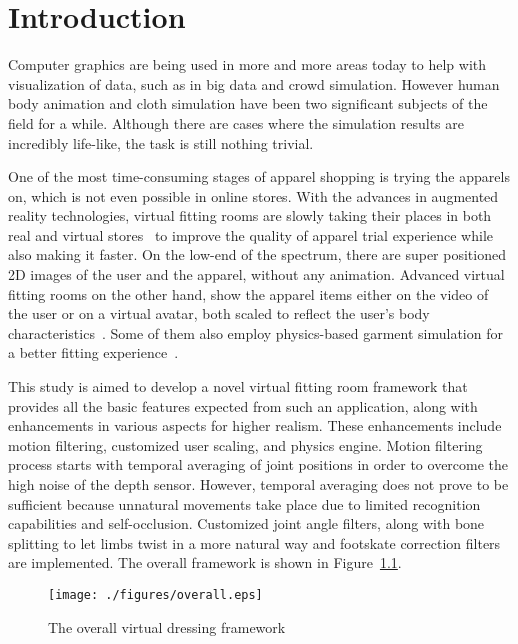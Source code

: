 \chapter{Introduction}
\label{chapter_introduction}

Computer graphics are being used in more and more areas today to help with visualization of data, such as in big data and crowd simulation. However human body animation and cloth simulation have been two significant subjects of the field for a while. Although there are cases where the simulation results are incredibly life-like, the task is still nothing trivial. 

One of the most time-consuming stages of apparel shopping is trying the apparels on, which is not even possible in online stores. With the advances in augmented reality technologies, virtual fitting rooms are slowly taking their places in both real and virtual stores~\cite{Fitnect2012,Styku2013} to improve the quality of apparel trial experience while also making it faster. On the low-end of the spectrum, there are super positioned 2D images of the user and the apparel, without any animation. Advanced virtual fitting rooms on the other hand, show the apparel items either on the video of the user or on a virtual avatar, both scaled to reflect the user's body characteristics~\cite{FaceCake2013}. Some of them also employ physics-based garment simulation for a better fitting experience~\cite{Styku2013}.

This study is aimed to develop a novel virtual fitting room framework that provides all the basic features expected from such an application, along with enhancements in various aspects for higher realism. These enhancements include motion filtering, customized user scaling, and physics engine. Motion filtering process starts with temporal averaging of joint positions in order to overcome the high noise of the depth sensor. However, temporal averaging does not prove to be sufficient because unnatural movements take place due to limited recognition capabilities and self-occlusion. Customized joint angle filters, along with bone splitting to let limbs twist in a more natural way and footskate correction filters are implemented. The overall framework is shown in Figure~\ref{fig:overall}. 

\begin{figure}[htbp]
	\centerline{
	\texttt{[image: ./figures/overall.eps]}
	}
	\caption{The overall virtual dressing framework}
	\label{fig:overall}
\end{figure}


